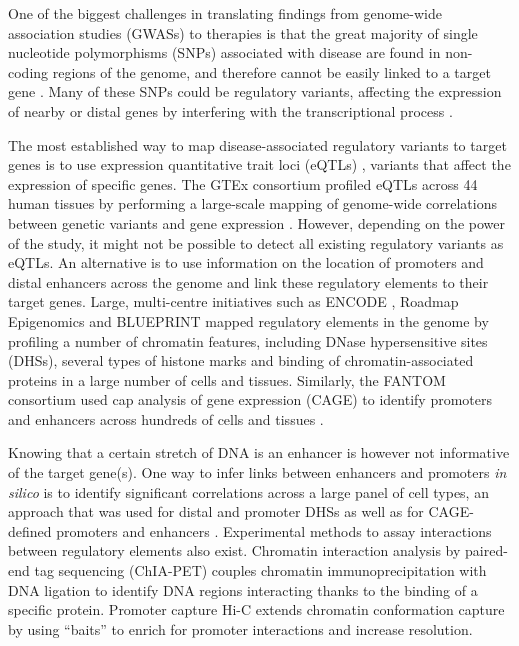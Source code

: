 \documentclass[9pt,a4paper,]{extarticle}
\theoremstyle{definition}
\theoremstyle{definition}
\theoremstyle{definition}
\theoremstyle{remark}
\begin{document}
One of the biggest challenges in translating findings from genome-wide association studies (GWASs) to therapies is that the great majority of single nucleotide polymorphisms (SNPs) associated with disease are found in non-coding regions of the genome, and therefore cannot be easily linked to a target gene \citep{Maurano2012}.
Many of these SNPs could be regulatory variants, affecting the expression of nearby or distal genes by interfering with the transcriptional process \citep{Ward2012}.

The most established way to map disease-associated regulatory variants to target genes is to use expression quantitative trait loci (eQTLs) \citep{Albert2015}, variants that affect the expression of specific genes.
The GTEx consortium profiled eQTLs across 44 human tissues by performing a large-scale mapping of genome-wide correlations between genetic variants and gene expression \citep{GTEx2017}.
However, depending on the power of the study, it might not be possible to detect all existing regulatory variants as eQTLs.
An alternative is to use information on the location of promoters and distal enhancers across the genome and link these regulatory elements to their target genes.
Large, multi-centre initiatives such as ENCODE \citep{ENCODE2012}, Roadmap Epigenomics \citep{Roadmap2015} and BLUEPRINT \citep{Adams2012, Stunnenberg2016} mapped regulatory elements in the genome by profiling a number of chromatin features, including DNase hypersensitive sites (DHSs), several types of histone marks and binding of chromatin-associated proteins in a large number of cells and tissues.
Similarly, the FANTOM consortium used cap analysis of gene expression (CAGE) to identify promoters and enhancers across hundreds of cells and tissues \citep{Fantom2014}.

Knowing that a certain stretch of DNA is an enhancer is however not informative of the target gene(s).
One way to infer links between enhancers and promoters \emph{in silico} is to identify significant correlations across a large panel of cell types, an approach that was used for distal and promoter DHSs \citep{Thurman2012} as well as for CAGE-defined promoters and enhancers \citep{Andersson2014}.
Experimental methods to assay interactions between regulatory elements also exist.
Chromatin interaction analysis by paired-end tag sequencing (ChIA-PET) \citep{Fullwood2009, Zhang2013} couples chromatin immunoprecipitation with DNA ligation to identify DNA regions interacting thanks to the binding of a specific protein.
Promoter capture Hi-C \citep{Mifsud2015, Javierre2016} extends chromatin conformation capture by using ``baits'' to enrich for promoter interactions and increase resolution.
\end{document}
